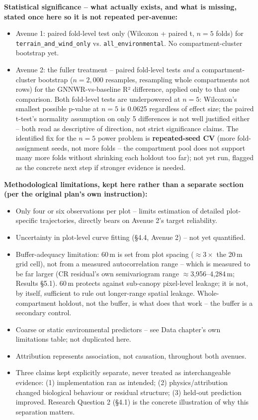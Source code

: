 \textbf{Statistical significance -- what actually exists, and what is missing, stated once here so
it is not repeated per-avenue:}
\begin{itemize}
\setlength\itemsep{0pt}
\item Avenue 1: paired fold-level test only (Wilcoxon + paired t, $n=5$ folds) for
\texttt{terrain\_and\_wind\_only} vs. \texttt{all\_environmental}. No compartment-cluster
bootstrap yet.
\item Avenue 2: the fuller treatment -- paired fold-level tests \emph{and} a compartment-cluster
bootstrap ($n=2{,}000$ resamples, resampling whole compartments not rows) for the GNNWR-vs-baseline
R² difference, applied only to that one comparison. Both fold-level tests are underpowered at
$n=5$: Wilcoxon's smallest possible p-value at $n=5$ is 0.0625 regardless of effect size; the
paired t-test's normality assumption on only 5 differences is not well justified either -- both
read as descriptive of direction, not strict significance claims. The identified fix for the
$n=5$ power problem is \textbf{repeated-seed CV} (more fold-assignment seeds, not more folds --
the compartment pool does not support many more folds without shrinking each holdout too far);
not yet run, flagged as the concrete next step if stronger evidence is needed.
\end{itemize}

\textbf{Methodological limitations, kept here rather than a separate section (per the original
plan's own instruction):}
\begin{itemize}
\setlength\itemsep{0pt}
\item Only four or six observations per plot -- limits estimation of detailed plot-specific
trajectories, directly bears on Avenue 2's target reliability.
\item Uncertainty in plot-level curve fitting (\S4.4, Avenue 2) -- not yet quantified.
\item Buffer-adequacy limitation: 60\,m is set from plot spacing ($\approx3\times$ the 20\,m grid
cell), not from a measured autocorrelation range -- which is measured to be far larger (CR
residual's own semivariogram range $\approx$3,956--4,284\,m; Results \S5.1). 60\,m protects
against sub-canopy pixel-level leakage; it is not, by itself, sufficient to rule out longer-range
spatial leakage. Whole-compartment holdout, not the buffer, is what does that work -- the buffer is
a secondary control.
\item Coarse or static environmental predictors -- see Data chapter's own limitations table; not
duplicated here.
\item Attribution represents association, not causation, throughout both avenues.
\item Three claims kept explicitly separate, never treated as interchangeable evidence: (1)
implementation ran as intended; (2) physics/attribution changed biological behaviour or residual
structure; (3) held-out prediction improved. Research Question 2 (\S4.1) is the concrete
illustration of why this separation matters.
\end{itemize}

